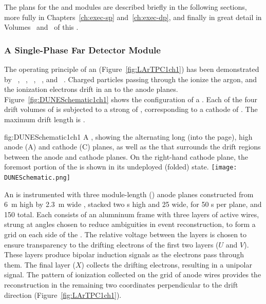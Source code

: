 The plans for the  and  modules are described briefly in the following sections, more fully in Chapters~\ref{ch:exec-sp} and~\ref{ch:exec-dp}, and finally in great detail in Volumes~\volnumbersp{} and~\volnumberdp{} of this . 


\subsubsection{A Single-Phase Far Detector Module}
\label{sec:fdsp-exec-splar}

The operating principle of an   (Figure~\ref{fig:LArTPC1ch1}) has been demonstrated by  ~\cite{Icarus-T600}, ~\cite{microboone}, ~\cite{Anderson:2012vc}, ~\cite{Cavanna:2014iqa}, and ~\cite{Abi:2017aow}. Charged particles passing through the  ionize the argon, and the ionization electrons drift in an \efield{} to the anode planes. Figure~\ref{fig:DUNESchematic1ch1} shows the configuration of a  . Each of the four drift volumes of  is subjected to a strong \efield{} of \spmaxfield, corresponding to a cathode  of \sptargetdriftvoltpos. The maximum drift length is \spmaxdrift.  


\begin{dunefigure}{fig:DUNESchematic1ch1}
{A \nominalmodsize {}  , showing the alternating \sptpclen{} long (into the page), \tpcheight{} high anode (A) and cathode (C) planes, as well as the  that surrounds the drift regions between the anode and cathode planes. On the right-hand cathode plane, the foremost portion of the  is shown in its undeployed (folded) state.}
\texttt{[image: DUNESchematic.png]}
\end{dunefigure}

An  is instrumented with three module-length (\sptpclen) anode planes constructed from \SI{6}{m} high by \SI{2.3}{m} wide , stacked two s high and 25 wide, for 50 s per plane, and 150 total. Each  %
consists of an alumninum frame with three layers of active wires, strung at angles chosen to reduce ambiguities in event reconstruction, to form a grid on each side of the . The relative voltage between the layers is chosen to ensure transparency to the drifting electrons of the first two layers ($U$ and $V$). These layers produce bipolar induction signals as the electrons pass through them. The final layer ($X$) collects the drifting electrons, resulting in a unipolar signal. The pattern of ionization collected on the grid of anode wires provides the reconstruction in the remaining two coordinates perpendicular to the drift direction (Figure~\ref{fig:LArTPC1ch1}).


